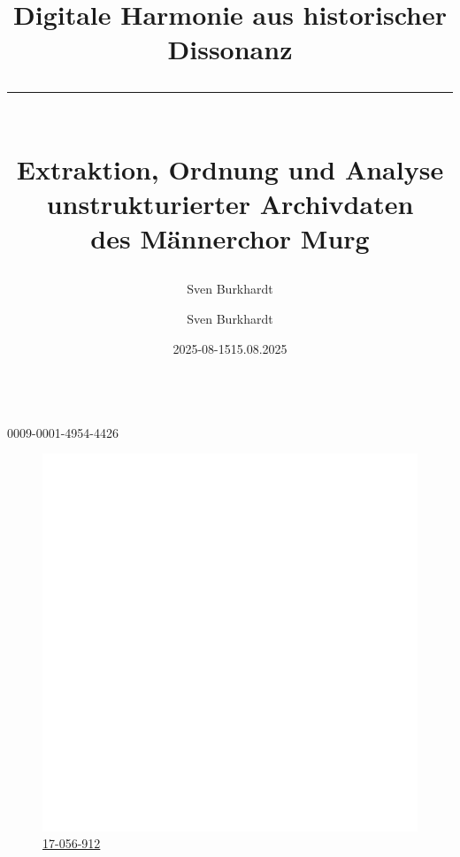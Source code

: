 \documentclass[12pt, a4paper, ngerman, bidi=default]{article}
\title{\vspace*{4cm} \LARGE Digitale Harmonie aus historischer Dissonanz
\color{UniMint} \rule{8cm}{1pt} \\  
\vspace{0.2cm}  
\color{white}\large Extraktion, Ordnung und Analyse\\unstrukturierter Archivdaten\\des Männerchor Murg}
\subtitle{}
\author{Sven Burkhardt}
\date{2025-08-15} %
\begin{document}
\begin{titlepage}
    
\color{white}
\pagecolor[HTML]{46505A} %
\date{}
\author{}
\maketitle
\begin{center}
  \author{\LARGE{\author{\vspace{-0.5cm}Sven Burkhardt}}}\\
  \vspace{4mm}
  \large{ {0009-0001-4954-4426}}\\ %
  \begin{figure}[h]
    \centering
    \color{white}
    \large{\href{https://dhlab.philhist.unibas.ch/en/persons/sven-burkhardt/}{{\hspace*{0.5mm}\includegraphics[height=4.5
  mm]{./assets/Logos/Uni_basel_logo_white.png}}\hspace{3.4mm}\color{white} 17-056-912}}\\ %
    
    \date{\hspace*{2mm}15.08.2025}%
  \end{figure}
  \setcounter{figure}{0}
\end{center}



\end{titlepage}
\end{document}
